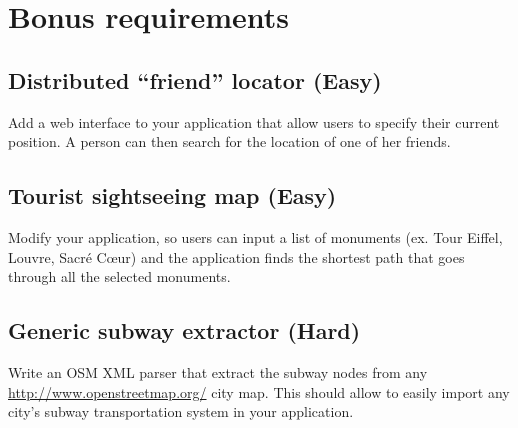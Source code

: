 \documentclass{exercices}
\renewcommand{\|}{\url|}
\begin{document}
\section{Bonus requirements}

\subsection{Distributed ``friend'' locator (Easy)}
Add a web interface to your application that allow users to specify their
current position. A person can then search for the location of one of her
friends.

\subsection{Tourist sightseeing map (Easy)}
Modify your application, so users can input a list
of monuments (ex. Tour Eiffel, Louvre, Sacr\'e C\oe ur) and the application
finds the shortest path that goes through all the selected monuments.

\subsection{Generic subway extractor (Hard)}
Write an OSM XML parser that extract the subway nodes from
any \url{http://www.openstreetmap.org/} city map.
This should allow to easily import any city's subway
transportation system in your application.
\end{document}
